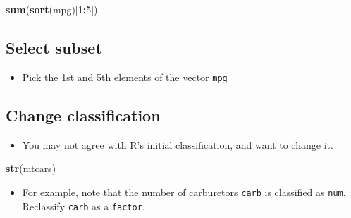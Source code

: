 \documentclass[]{article}
\newenvironment{Shaded}{\begin{snugshade}}{\end{snugshade}}
\newcommand{\CommentTok}[1]{\textcolor[rgb]{0.56,0.35,0.01}{\textit{#1}}}
\newcommand{\DecValTok}[1]{\textcolor[rgb]{0.00,0.00,0.81}{#1}}
\newcommand{\KeywordTok}[1]{\textcolor[rgb]{0.13,0.29,0.53}{\textbf{#1}}}
\newcommand{\NormalTok}[1]{#1}
\newcommand{\OperatorTok}[1]{\textcolor[rgb]{0.81,0.36,0.00}{\textbf{#1}}}
\providecommand{\tightlist}{%
  \setlength{\itemsep}{0pt}\setlength{\parskip}{0pt}}
\begin{document}
\begin{Shaded}
\begin{Highlighting}[]
\KeywordTok{sum}\NormalTok{(}\KeywordTok{sort}\NormalTok{(mpg)[}\DecValTok{1}\OperatorTok{:}\DecValTok{5}\NormalTok{])}
\end{Highlighting}
\end{Shaded}

\hypertarget{select-subset}{%
\subsection{Select subset}\label{select-subset}}

\begin{itemize}
\tightlist
\item
  Pick the 1st and 5th elements of the vector \texttt{mpg}
\end{itemize}

\begin{Shaded}
\end{Shaded}

\hypertarget{change-classification}{%
\subsection{Change classification}\label{change-classification}}

\begin{itemize}
\tightlist
\item
  You may not agree with R's initial classification, and want to change it.
\end{itemize}

\begin{Shaded}
\begin{Highlighting}[]
\KeywordTok{str}\NormalTok{(mtcars)}
\end{Highlighting}
\end{Shaded}

\begin{itemize}
\tightlist
\item
  For example, note that the number of carburetors \texttt{carb} is classified as \texttt{num}. Reclassify \texttt{carb} as a \texttt{factor}.
\end{itemize}
\end{document}
